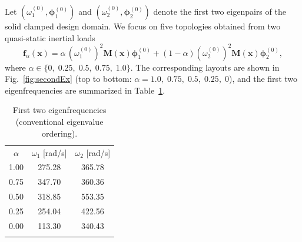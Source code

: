\documentclass[pdflatex,lineno,sn-mathphys-ay]{sn-jnl}
\begin{document}
Let $(\omega_1^{(0)},\boldsymbol{\phi}_1^{(0)})$ and $(\omega_2^{(0)},\boldsymbol{\phi}_2^{(0)})$ denote the first two eigenpairs of the solid clamped design domain. We focus on five topologies obtained from two quasi-static inertial loads
\begin{equation}\label{eqn:multiload}
\mathbf{f}_{\alpha}(\mathbf{x})=\alpha\,(\omega_{1}^{(0)})^{2}\mathbf{M}(\mathbf{x})\boldsymbol{\phi}_{1}^{(0)}+\left(1-\alpha\right)(\omega_{2}^{(0)})^{2}\mathbf{M}(\mathbf{x})\boldsymbol{\phi}_{2}^{(0)},
\end{equation} where $\alpha \in \{0,\;0.25,\;0.5,\;0.75,\;1.0\}$.
The corresponding layouts are shown in Fig.~\ref{fig:secondEx} (top to bottom: $\alpha=1.0,\;0.75,\;0.5,\;0.25,\;0$), and the first two eigenfrequencies are summarized in Table~\ref{tab:clampedBeamFreq}.
\begin{table}[htbp]
\centering
\caption{First two eigenfrequencies (conventional eigenvalue ordering).}
\label{tab:clampedBeamFreq}
\begin{tabular}{ccc}
\Xhline{1.2pt}
$\alpha$ & $\omega_1$ [rad/s] & $\omega_2$ [rad/s] \\
\Xhline{1.2pt}
1.00 & 275.28 & 365.78 \\
0.75 & 347.70 & 360.36 \\
0.50 & 318.85 & 553.35 \\
0.25 & 254.04 & 422.56 \\
0.00 & 113.30 & 340.43 \\
\Xhline{1.2pt}
\end{tabular}
\end{table}
\end{document}
